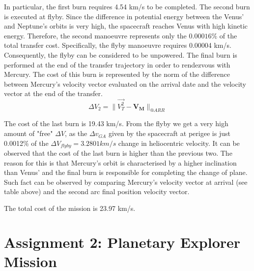 \documentclass[11pt,a4paper]{report}
\renewcommand{\vec}[1]{\mathbf{#1}}
\begin{document}
In particular, the first burn requires 4.54 km/s to be completed.
The second burn is executed at flyby. Since the difference in potential energy between the Venus' and Neptune’s orbits is very high, the spacecraft reaches Venus with high kinetic energy. Therefore, the second manoeuvre represents only the $0.00016\%$ of the total transfer cost. Specifically, the flyby manoeuvre requires 0.00004 km/s. Consequently, the flyby can be considered to be unpowered.
The final burn is performed at the end of the transfer trajectory in order to rendezvous with Mercury. The cost of this burn is represented by the norm of the difference between Mercury’s velocity vector evaluated on the arrival date and the velocity vector at the end of the transfer.
\begin{equation*}
    \Delta V_2 = \parallel\Vec{V_T^2} - \vec{V_M}\parallel_{@ARR}
\end{equation*}


\begin{table}[H]
\centering
{}
\end{table}
The cost of the last burn is 19.43 km/s.
From the flyby we get a very high amount of "free" $\Delta V$, as the $\Delta v_{GA}$ given by the spacecraft at perigee is just 0.0012\% of the $\Delta V_{flyby} = 3.2801 km/s$ change in heliocentric velocity.
It can be observed that the cost of the last burn is higher than the previous two. The reason for this is that Mercury's orbit is characterised by a higher inclination than Venus' and the final burn is responsible for completing the change of plane. Such fact can be observed by comparing Mercury's velocity vector at arrival (see table above) and the second arc final position velocity vector.

The total cost of the mission is 23.97 km/s.

\chapter{Assignment 2: Planetary Explorer Mission}
\end{document}

